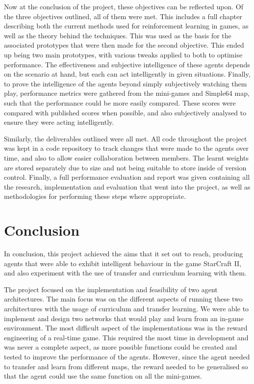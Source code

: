 Now at the conclusion of the project, these objectives can be reflected upon. Of
the three objectives outlined, all of them were met. This includes a full
chapter describing both the current methods used for reinforcement learning in
games, as well as the theory behind the techniques. This was used as the basis
for the associated prototypes that were then made for the second objective. This
ended up being two main prototypes, with various tweaks applied to both to
optimise performance. The effectiveness and subjective intelligence of these
agents depends on the scenario at hand, but each can act intelligently
in given situations. Finally, to prove the intelligence of the agents beyond
simply subjectively watching them play, performance metrics were gathered from
the mini-games and Simple64 map, such that the performance could be more easily
compared. These scores were compared with published scores when possible, and
also subjectively analysed to ensure they were acting intelligently.

Similarly, the deliverables outlined were all met. All code throughout the
project was kept in a code repository to track changes that were made to the
agents over time, and also to allow easier collaboration between members. The
learnt weights are stored separately due to size and not being suitable to store
inside of version control. Finally, a full performance evaluation and report was
given containing all the research, implementation and evaluation that went into
the project, as well as methodologies for performing these steps where
appropriate.


\section{Conclusion}

In conclusion, this project achieved the aims that it set out to reach,
producing agents that were able to exhibit intelligent behaviour in the game
StarCraft II, and also experiment with the use of transfer and curriculum
learning with them.

The project focused on the implementation and feasibility of two agent
architectures. The main focus was on the different aspects of running these two
architectures with the usage of curriculum and transfer learning. We were able
to implement and design two networks that would play and learn from an in-game
environment. The most difficult aspect of the implementations was in the reward
engineering of a real-time game. This required the most time in development and
was never a complete aspect, as more possible functions could be created and
tested to improve the performance of the agents. However, since the agent needed
to transfer and learn from different maps, the reward needed to be generalised
so that the agent could use the same function on all the mini-games.


